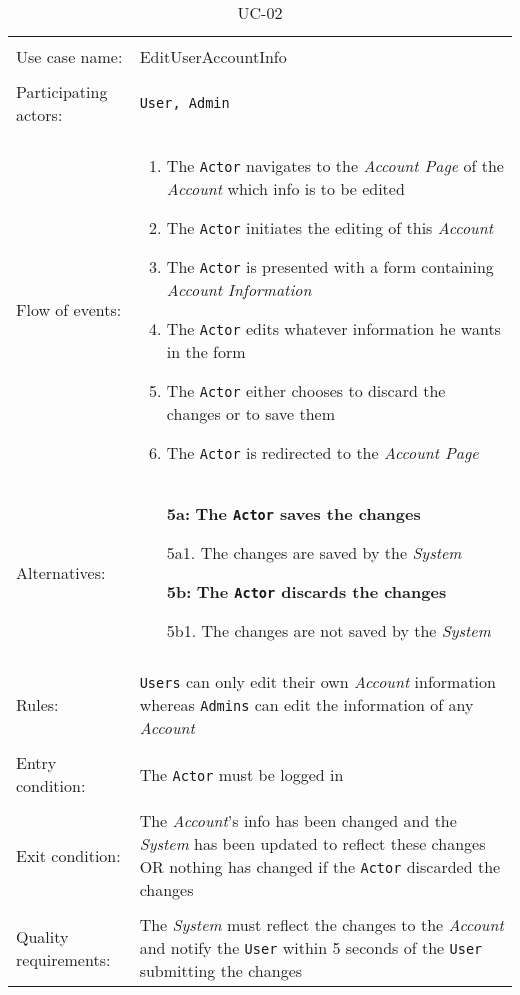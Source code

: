 \noindent
\begin{table}[h!]
\caption{UC-02}
\label{UC-02}
\centering
\begin{tabular}{ l  p{8cm} } 
\hline 
\\
Use case name:  & EditUserAccountInfo   \\   \hline    
\\            
Participating actors:  & \texttt{User, \texttt{Admin}} \\   \hline   
\\      
Flow of events: & \begin{enumerate}
\item{The \texttt{Actor} navigates to the \textit{Account Page} of the \textit{Account} which info is to be edited}
\item{The \texttt{Actor} initiates the editing of this \textit{Account}}
\item{The \texttt{Actor} is presented with a form containing \textit{Account Information}}
\item{The \texttt{Actor} edits whatever information he wants in the form}
\item{The \texttt{Actor} either chooses to discard the changes or to save them}
\item{The \texttt{Actor} is redirected to the \textit{Account Page}}
\end{enumerate}
\\
Alternatives: & \begin{itemize}
\item[\textbf{5a:}]{\textbf{The \texttt{Actor} saves the changes}}
\item[]  5a1. The changes are saved by the \textit{System}
\item[\textbf{5b:}]\textbf{The \texttt{Actor} discards the changes}
\item[]  5b1. The changes are not saved by the \textit{System}
\end{itemize}
\\ \hline
\\
Rules: & \texttt{Users} can only edit their own \textit{Account} information whereas \texttt{Admins} can edit the information of any  \textit{Account}
\\   \hline 
\\
Entry condition: & The \texttt{Actor} must be logged in \\ \hline
\\
Exit condition: & The \textit{Account}'s info has been changed and the \textit{System} has been updated to reflect these changes OR
nothing has changed if the \texttt{Actor} discarded the changes\\ \hline
\\
Quality requirements: & The \textit{System} must reflect the changes to the \textit{Account} and notify the \texttt{User} within 5 seconds of the \texttt{User} submitting the changes \\ \hline  
\end{tabular}
\end{table}

